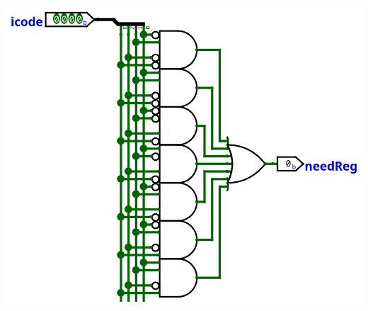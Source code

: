 \documentclass{article}
\begin{document}
\begin{center}
    \includegraphics[scale=.7]{needsReg.png}
\end{center}
\end{document}
